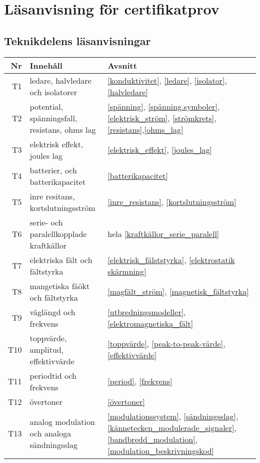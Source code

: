

\onecolumn

\chapter{Läsanvisning för certifikatprov}

\section{Teknikdelens läsanvisningar}


\begin{table}[H]
	\small
\begin{tabular}{rll}
\textbf{Nr} & \textbf{Innehåll} & \textbf{Avsnitt}\\ \hline\hline
T1 & ledare, halvledare och isolatorer & 
\ref{konduktivitet}, \ref{ledare}, \ref{isolator}, \ref{halvledare}\\ \hline
T2 & potential, spänningsfall, resistans, ohms lag &
\ref{spänning}, \ref{spänning.symboler}, \ref{elektrisk_ström}, \ref{strömkrets}, \ref{resistans},\ref{ohms_lag}\\ \hline
T3 & elektrisk effekt, joules lag &
\ref{elektrisk_effekt}, \ref{joules_lag}\\ \hline
T4 & batterier, och batterikapacitet & 
\ref{batterikapacitet}\\ \hline
T5 & inre resitans, kortslutningsström & 
\ref{inre_resistans}, \ref{kortslutningsström}\\ \hline
T6 & serie- och paralellkopplade kraftkällor &
hela \ref{kraftkällor_serie_paralell}\\ \hline
T7 & elektriska fält och fältstyrka &
\ref{elektrisk_fälststyrka}, \ref{elektrostatik skärmning}\\ \hline
T8 & mangetiska fäökt och fältstyrka &
\ref{magfält_ström}, \ref{magnetisk_fältstyrka}\\ \hline
T9 & våglängd och frekvens &
\ref{utbredningsmodeller}, \ref{elektromagnetiska_fält}\\ \hline
T10 & toppvärde, amplitud, effektivvärde &
\ref{toppvärde}, \ref{peak-to-peak-värde}, \ref{effektivvärde}\\ \hline
T11 & periodtid och frekvens&
\ref{period}, \ref{frekvens}\\ \hline
T12 & övertoner &
\ref{övertoner}\\ \hline
T13 & analog modulation och analoga sändningsslag&
\ref{modulationssystem}, \ref{sändningsslag}, \ref{kännetecken_modulerade_signaler}, 
\ref{bandbredd_modulation},  \ref{modulation_beskrivningskod}\\

\end{tabular}
\end{table}
